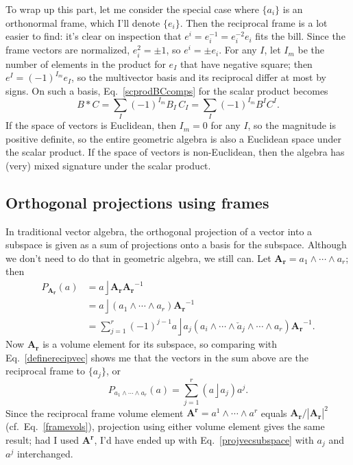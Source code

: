 \documentclass{utarticle}
\newcommand{\bl}[1]{\ensuremath{\bm{#1}}}
\DeclareMathOperator{\lin}{\rfloor}
\DeclareMathOperator{\out}{\wedge}
\newcommand{\scprod}[2]{\ensuremath{#1 * #2}}
\begin{document}
To wrap up this part, let me consider the special case where $\{a_i\}$ is an orthonormal 
frame, which I'll denote $\{e_i\}$.  Then the reciprocal frame is a lot easier to find: it's clear 
on inspection that $e^i = e_i^{-1} = e_i^{-2} e_i$ fits the bill.  Since the frame vectors
are normalized, $e_i^2 = \pm1$, so $e^i = \pm e_i$.  For any $I$, let $I_m$ be the 
number of elements in the product for $e_I$ that have negative square; then $e^I = 
(-1)^{I_m} e_I$, so the multivector basis and its reciprocal differ at most by signs.  
On such a basis, Eq.~\eqref{scprodBCcomps} for the scalar product becomes 
\begin{equation} 
\scprod{B}{C} = \sum_I (-1)^{I_m} B_I \, C_I = \sum_I (-1)^{I_m} B^I C^I.
\end{equation}
If the space of vectors is Euclidean, then $I_m = 0$ for any $I$, so
the magnitude is positive definite, so the entire geometric algebra is 
also a Euclidean space under the scalar product.  If the space of vectors
is non-Euclidean, then the algebra has (very) mixed signature under
the scalar product.

\subsection{Orthogonal projections using frames}
\label{projframes}

In traditional vector algebra, the orthogonal projection of a vector into a subspace is
given as a sum of projections onto a basis for the subspace.  Although 
we don't need to do that in geometric algebra, we still can.  Let $\bl{A_r} = a_1 \out 
\dotsb \out a_r$; then
\begin{align}
P_{\bl{A_r}}(a) & = a \lin \bl{A_r} \bl{A_r}^{-1} \nonumber \\
                           & = a \lin (a_1 \out \dotsb \out a_r) \bl{A_r}^{-1} \nonumber \\
                           & = \sum_{j=1}^r (-1)^{j-1} a \lin a_j (a_i \out \dotsb \out \check{a}_j \out \dotsb \out a_r)  \bl{A_r}^{-1}.
\end{align}
Now \bl{A_r} is a volume element for its subspace, so comparing with 
Eq.~\eqref{definerecipvec} shows me that the vectors in the sum above are the 
reciprocal frame to $\{a_j\}$, or
\begin{equation} 
P_{a_1 \out \dotsb \out a_r}(a) = \sum_{j=1}^r (a \lin a_j) a^j. 
\label{projvecsubspace}
\end{equation}
Since the reciprocal frame volume element $\bl{A^r} = a^1 \out \dotsb \out a^r$ 
equals $\bl{A_r}/|\bl{A_r}|^2$ (cf.\ Eq.~\eqref{framevols}), projection using either 
volume element gives the same result; had I used \bl{A^r}, I'd have ended up with 
Eq.~\eqref{projvecsubspace} with $a_j$ and $a^j$ interchanged.
\end{document}
